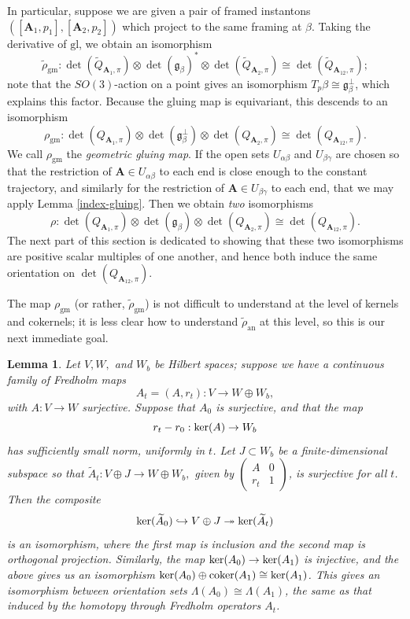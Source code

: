 \documentclass{memo-l}
\newtheorem{lemma}[theorem]{Lemma}
\theoremstyle{definition}
\theoremstyle{remark}
\numberwithin{section}{chapter}
\numberwithin{equation}{chapter}
\begin{document}
In particular, suppose we are given a pair of framed instantons $([\mathbf{A}_1,p_1], [\mathbf{A}_2,p_2])$ which project to the same framing at $\beta$. Taking the derivative of $\text{gl}$, we obtain an isomorphism $$\widetilde{\rho}_{\text{gm}}: \det\left(\widetilde{Q}_{\mathbf{A}_1, \pi}\right) \otimes \det(\mathfrak g_\beta)^* \otimes \det\left(\widetilde{Q}_{\mathbf{A}_2, \pi}\right) \cong \det\left(\widetilde{Q}_{\mathbf{A}_{12}, \pi}\right);$$ note that the $SO(3)$-action on a point gives an isomorphism $T_p \beta \cong \mathfrak g_\beta^\perp$, which explains this factor. Because the gluing map is equivariant, this descends to an isomorphism $$\rho_{\text{gm}}: \det\left({Q_{\mathbf{A}_1, \pi}}\right) \otimes \det(\mathfrak g^\perp_\beta) \otimes \det\left({Q_{\mathbf{A}_2, \pi}}\right) \cong \det\left({Q_{\mathbf{A}_{12}, \pi}}\right).$$
We call $\rho_{\text{gm}}$ the \emph{geometric gluing map}. If the open sets $U_{\alpha \beta}$ and $U_{\beta \gamma}$ are chosen so that the restriction of $\mathbf{A} \in U_{\alpha \beta}$ to each end is close enough to the constant trajectory, and similarly for the restriction of $\mathbf{A} \in U_{\beta \gamma}$ to each end, that we may apply Lemma \ref{index-gluing}. Then we obtain \emph{two} isomorphisms
$$\rho: \det\left({Q_{\mathbf{A}_1, \pi}}\right) \otimes \det(\mathfrak g_\beta) \otimes \det\left({Q_{\mathbf{A}_2, \pi}}\right) \cong \det\left({Q_{\mathbf{A}_{12}, \pi}}\right).$$ 
The next part of this section is dedicated to showing that these two isomorphisms are positive scalar multiples of one another, and hence both induce the same orientation on $\det\left({Q_{\mathbf{A}_{12}, \pi}}\right)$.

The map $\rho_{\text{gm}}$ (or rather, $\widetilde{\rho}_{\text{gm}}$) is not difficult to understand at the level of kernels and cokernels; it is less clear how to understand $\widetilde{\rho}_{\text{an}}$ at this level, so this is our next immediate goal. 

\begin{lemma}\label{ker-coker}Let $V, W, $ and $W_b$ be Hilbert spaces; suppose we have a continuous family of Fredholm maps $$A_t = (A, r_t): V \to W \oplus W_b,$$ with $A: V \to W$ surjective. Suppose that $A_0$ is surjective, and that the map $$r_t - r_0: \textup{ker}(A) \to W_b$$ has sufficiently small norm, uniformly in $t$. Let $J \subset W_b$ be a finite-dimensional subspace so that $\widetilde A_t: V \oplus J \to W \oplus W_b,$ given by $\begin{pmatrix}A & 0\\ r_t & 1\end{pmatrix}$, is surjective for all $t$. Then the composite $$\textup{ker}(\widetilde{A}_0) \hookrightarrow V \oplus J \twoheadrightarrow \textup{ker}(\widetilde A_t)$$ is an isomorphism, where the first map is inclusion and the second map is orthogonal projection. Similarly, the map $\textup{ker}(A_0) \to \textup{ker}(A_1)$ is injective, and the above gives us an isomorphism $\textup{ker}(A_0) \oplus \textup{coker}(A_1) \cong \textup{ker}(A_1)$. This gives an isomorphism between orientation sets $\Lambda(A_0) \cong \Lambda(A_1)$, the same as that induced by the homotopy through Fredholm operators $A_t$.
\end{lemma}
\end{document}
